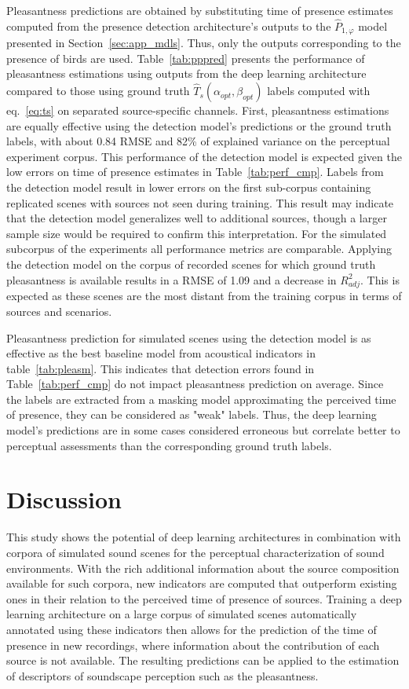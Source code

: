 \documentclass[twocolumn]{article}
\begin{document}
Pleasantness predictions are obtained by substituting time of presence estimates computed from the presence detection architecture's outputs to the $\hat P_{1, \varphi}$ model presented in Section~\ref{sec:app_mdls}. Thus, only the outputs corresponding to the presence of birds are used. Table~\ref{tab:pppred} presents the performance of pleasantness estimations using outputs from the deep learning architecture compared to those using ground truth $\hat T_s(\alpha_{opt}, \beta_{opt})$ labels computed with eq.~\ref{eq:ts} on separated source-specific channels. First, pleasantness estimations are equally effective using the detection model's predictions or the ground truth labels, with about 0.84 RMSE and 82\% of explained variance on the perceptual experiment corpus. This performance of the detection model is expected given the low errors on time of presence estimates in Table~\ref{tab:perf_cmp}. Labels from the detection model result in lower errors on the first sub-corpus containing replicated scenes with sources not seen during training. This result may indicate that the detection model generalizes well to additional sources, though a larger sample size would be required to confirm this interpretation. For the simulated subcorpus of the experiments all performance metrics are comparable. Applying the detection model on the corpus of recorded scenes for which ground truth pleasantness is available results in a RMSE of 1.09 and a decrease in $R^2_{adj}$. This is expected as these scenes are the most distant from the training corpus in terms of sources and scenarios.

Pleasantness prediction for simulated scenes using the detection model is as effective as the best baseline model from acoustical indicators in table~\ref{tab:pleasm}. This indicates that detection errors found in Table~\ref{tab:perf_cmp} do not impact pleasantness prediction on average. Since the labels are extracted from a masking model approximating the perceived time of presence, they can be considered as "weak" labels. Thus, the deep learning model's predictions are in some cases considered erroneous but correlate better to perceptual assessments than the corresponding ground truth labels.

\section{Discussion}
\label{sec:discussion}

This study shows the potential of deep learning architectures in combination with corpora of simulated sound scenes for the perceptual characterization of sound environments. With the rich additional information about the source composition available for such corpora, new indicators are computed that outperform existing ones in their relation to the perceived time of presence of sources. Training a deep learning architecture on a large corpus of simulated scenes automatically annotated using these indicators then allows for the prediction of the time of presence in new recordings, where information about the contribution of each source is not available. The resulting predictions can be applied to the estimation of descriptors of soundscape perception such as the pleasantness.
\end{document}
